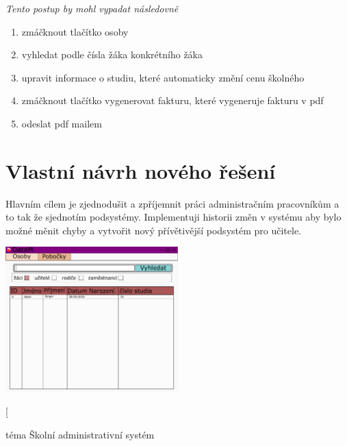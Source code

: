 \documentclass[a4paper, 11pt, twocolumn]{article}
\begin{document}
	\vspace*{0.2cm}
   	\textit{Tento postup by mohl vypadat následovně}
	\vspace*{0.2cm}
	
   	\begin{enumerate}
        \item zmáčknout tlačítko osoby
        \vspace{-0.2cm}
        \item vyhledat podle čísla žáka konkrétního žáka
        \vspace{-0.2cm}
        \item  upravit informace o studiu, které automaticky změní cenu školného
        \vspace{-0.2cm}
        \item  zmáčknout tlačítko vygenerovat fakturu, které vygeneruje fakturu v pdf
        \vspace{-0.2cm}
        \item  odeslat pdf mailem
        \vspace{-0.2cm}
   	\end{enumerate}

	\newpage

	\section*{\large{Vlastní návrh nového řešení}}
	\vspace*{-0.2cm}
	Hlavním cílem je zjednodušit a zpříjemnit práci administračním pracovníkům a to tak že sjednotím podsystémy. Implementuji historii změn v systému 
	aby bylo možné měnit chyby a vytvořit nový přívětivější podsystém pro učitele.

	\begin{center}
	\includegraphics[width=0.5\textwidth]{GUI.pdf}
	\end{center}


	\newpage


	\twocolumn[{
	{\Large téma Školní administrativní systém\par}}
	\par\vspace*{0.8cm}
\end{document}
